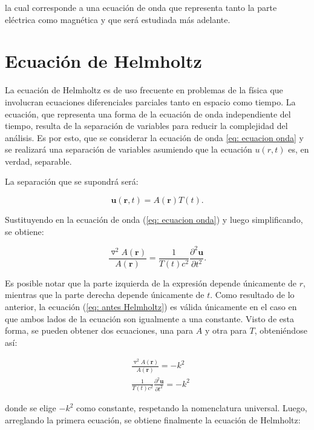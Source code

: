 \documentclass[12pt,letterpaper]{report}
\numberwithin{equation}{section}
\begin{document}
\noindent la cual corresponde a una ecuación de onda que representa tanto la parte eléctrica como magnética y que será estudiada más adelante. 


\section{Ecuación de Helmholtz}

La ecuación de Helmholtz es de uso frecuente en problemas de la física que involucran ecuaciones diferenciales parciales tanto en espacio como tiempo. La ecuación, que representa una forma de la ecuación de onda independiente del tiempo, resulta de la separación de variables para reducir la complejidad del análisis. Es por esto, que se considerar la ecuación de onda \ref{eq: ecuacion onda} y se realizará una separación de variables asumiendo que la ecuación $u(r,t)$ es, en verdad, separable.

\noindent La separación que se supondrá será:


$$\textbf{u}(\textbf{r},t)=A(\textbf{r})T(t).$$

\noindent Sustituyendo en la ecuación de onda (\ref{eq: ecuacion onda}) y luego simplificando, se obtiene:

\begin{equation}
\frac{\triangledown^2A(\textbf{r})}{A(\textbf{r})} = \frac{1}{T(t)c^2}\frac{\partial^2\textbf{u}}{\partial t^2}.
\label{eq: antes Helmholtz}
\end{equation}

Es posible notar que la parte izquierda de la expresión depende únicamente de $r$, mientras que la parte derecha depende únicamente de $t$. Como resultado de lo anterior, la ecuación (\ref{eq: antes Helmholtz}) es válida únicamente en el caso en que ambos lados de la ecuación son igualmente a una constante. Visto de esta forma, se pueden obtener dos ecuaciones, una para $A$ y otra para $T$, obteniéndose así:


\begin{equation*}
\begin{split}
&\frac{\triangledown^2A(\textbf{r})}{A(\textbf{r})} = -k^2\\
&\frac{1}{T(t)c^2}\frac{\partial^2\textbf{u}}{\partial t^2} = -k^2
\end{split}    
\end{equation*} 

\noindent donde se elige $-k^2$ como constante, respetando la nomenclatura universal. Luego, arreglando la primera ecuación, se obtiene finalmente la ecuación de Helmholtz:
\end{document}
